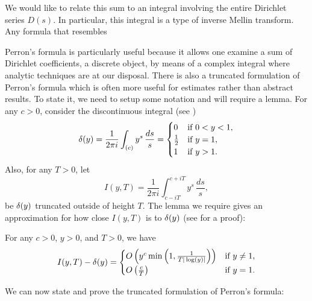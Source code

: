       We would like to relate this sum to an integral involving the entire Dirichlet series $D(s)$. In particular, this integral is a type of inverse Mellin transform. Any formula that resembles  

      Perron's formula is particularly useful because it allows one examine a sum of Dirichlet coefficients, a discrete object, by means of a complex integral where analytic techniques are at our disposal. There is also a truncated formulation of Perron's formula which is often more useful for estimates rather than abstract results. To state it, we need to setup some notation and will require a lemma. For any $c > 0$, consider the discontinuous integral (see \cite{davenport1980multiplicative})
      \[
        \delta(y) = \frac{1}{2\pi i}\int_{(c)}y^{s}\,\frac{ds}{s} = \begin{cases} 0 & \text{if $0 < y < 1$}, \\ \frac{1}{2} & \text{if $y = 1$}, \\ 1 & \text{if $y > 1$}. \end{cases}
      \]
      Also, for any $T > 0$, let
      \[
        I(y,T) = \frac{1}{2\pi i}\int_{c-iT}^{c+iT}y^{s}\,\frac{ds}{s},
      \]
      be $\delta(y)$ truncated outside of height $T$. The lemma we require gives an approximation for how close $I(y,T)$ is to $\delta(y)$ (see \cite{davenport1980multiplicative} for a proof):

      \begin{lemma}\label{lem:delta_truncation_estimate}
        For any $c > 0$, $y > 0$, and $T > 0$, we have
        \[
          I(y,T)-\delta(y) = \begin{cases} O\left(y^{c}\min\left(1,\frac{1}{T|\log(y)|}\right)\right) & \text{if $y \neq 1$}, \\ O\left(\frac{c}{T}\right) & \text{if $y = 1$}. \end{cases}
        \]
      \end{lemma}

      We can now state and prove the truncated formulation of Perron's formula:

